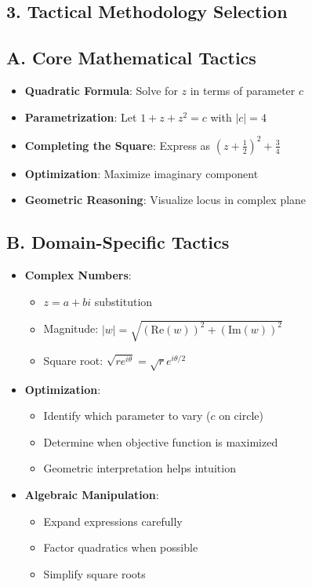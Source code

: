 \documentclass[11pt]{article}
\begin{document}
\begin{tacticalbox}
\section*{3. Tactical Methodology Selection}

\subsection*{A. Core Mathematical Tactics}
\begin{itemize}[leftmargin=*]
    \item \textbf{Quadratic Formula}: Solve for $z$ in terms of parameter $c$
    \item \textbf{Parametrization}: Let $1+z+z^2 = c$ with $|c| = 4$
    \item \textbf{Completing the Square}: Express as $(z+\frac{1}{2})^2 + \frac{3}{4}$
    \item \textbf{Optimization}: Maximize imaginary component
    \item \textbf{Geometric Reasoning}: Visualize locus in complex plane
\end{itemize}

\subsection*{B. Domain-Specific Tactics}
\begin{itemize}[leftmargin=*]
    \item \textbf{Complex Numbers}:
    \begin{itemize}
        \item $z = a + bi$ substitution
        \item Magnitude: $|w| = \sqrt{(\text{Re}(w))^2 + (\text{Im}(w))^2}$
        \item Square root: $\sqrt{re^{i\theta}} = \sqrt{r}e^{i\theta/2}$
    \end{itemize}
    \item \textbf{Optimization}:
    \begin{itemize}
        \item Identify which parameter to vary ($c$ on circle)
        \item Determine when objective function is maximized
        \item Geometric interpretation helps intuition
    \end{itemize}
    \item \textbf{Algebraic Manipulation}:
    \begin{itemize}
        \item Expand expressions carefully
        \item Factor quadratics when possible
        \item Simplify square roots
    \end{itemize}
\end{itemize}


\end{tacticalbox}
\end{document}
